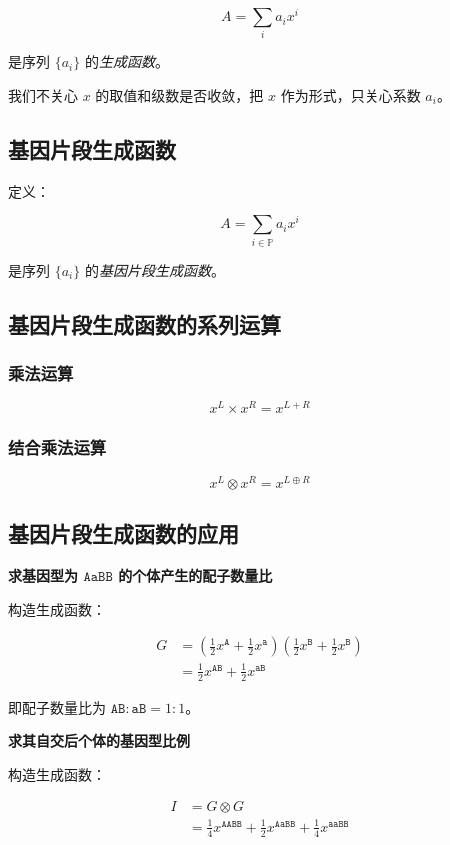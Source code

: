 \documentclass{article}
\begin{document}
$$A=\sum_{i} a_i x^{i}$$

是序列 $\{a_i\}$ 的\textsl{生成函数}。

我们不关心 $x$ 的取值和级数是否收敛，把 $x$ 作为形式，只关心系数 $a_i$。

\subsection{基因片段生成函数}

定义：

$$A=\sum_{i \in \mathbb{P}} a_i x^{i}$$

是序列 $\{a_i\}$ 的\textsl{基因片段生成函数}。

\subsection{基因片段生成函数的系列运算}

\subsubsection*{乘法运算}

$$x^L \times x^R=x^{L+R}$$

\subsubsection*{结合乘法运算}

$$x^L \otimes x^R=x^{L \oplus R}$$

\subsection{基因片段生成函数的应用}

\textbf{求基因型为 $\texttt{AaBB}$ 的个体产生的配子数量比}

构造生成函数：

$$\begin{aligned}
    G &= (\frac{1}{2} x^{\texttt{A}}+ \frac{1}{2}x^{\texttt{a}})(\frac{1}{2} x^{\texttt{B}}+ \frac{1}{2}x^{\texttt{B}}) \\
                &= \frac{1}{2} x^{\texttt{AB}} + \frac{1}{2} x^{\texttt{aB}}
\end{aligned}$$

即配子数量比为 $\texttt{AB} : \texttt{aB}=1:1$。

\textbf{求其自交后个体的基因型比例}

构造生成函数：

$$\begin{aligned}
    I &= G \otimes G \\
        &= \frac{1}{4} x^{\texttt{AABB}} + \frac{1}{2} x^{\texttt{AaBB}} + \frac{1}{4} x^{\texttt{aaBB}}
\end{aligned}$$
\end{document}
